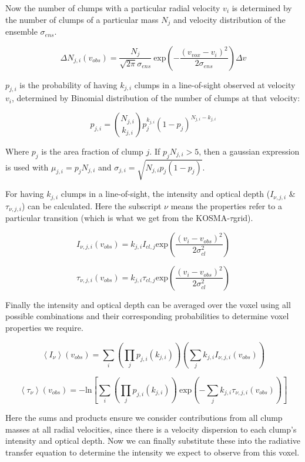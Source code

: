 \documentclass[a4paper]{article}
\newcommand{\kosmatau}{KOSMA-\(\tau\)}
\begin{document}
    Now the number of clumps with a particular radial velocity \(v_i\) is determined by the number of clumps of a particular mass \(N_j\) and velocity distribution of the ensemble \(\sigma_{ens}\).

    \[
    \Delta N_{j,i} (v_{obs}) = \frac{N_j}{\sqrt{2 \pi} \sigma_{ens}} \ \mathrm{exp} \left( -\frac{(v_{vox}-v_i)^2}{2 \sigma_{ens}} \right) \Delta v
    \]

    \(p_{j,i}\) is the probability of having \(k_{j,i}\) clumps in a line-of-sight observed at velocity \(v_i\), determined by Binomial distribution of the number of clumps at that velocity:

    \[
    p_{j,i} = \binom{N_{j,i}}{k_{j,i}} p_j^{k_{j,i}} (1-p_j)^{N_{j,i}-k_{j,i}}
    \]

    Where \(p_j\) is the area fraction of clump \(j\).
    If \(p_j N_{j,i}>5\), then a gaussian expression is used with \(\mu_{j,i} = p_j N_{j,i}\) and \(\sigma_{j,i} = \sqrt{N_{j,i} p_j (1-p_j)}\).

    For having \(k_{j,i}\) clumps in a line-of-sight, the intensity and optical depth (\(I_{\nu,j,i}\) \& \(\tau_{\nu,j,i}\)) can be calculated.
    Here the subscript \(\nu\) means the properties refer to a particular transition (which is what we get from the \kosmatau grid).

    \[
    I_{\nu,j,i} (v_{obs}) = k_{j,i} I_{cl,j} \mathrm{exp} \left( \frac{(v_i-v_{obs})^2}{2\sigma_{cl}^2} \right)
    \]

    \[
    \tau_{\nu,j,i} (v_{obs}) = k_{j,i} \tau_{cl,j} \mathrm{exp} \left( \frac{(v_i-v_{obs})^2}{2\sigma_{cl}^2} \right)
    \]

    Finally the intensity and optical depth can be averaged over the voxel using all possible combinations and their corresponding probabilities to determine voxel properties we require.

    \[
    \left< I_\nu \right> (v_{obs}) = \sum_i \left( \prod_j p_{j,i}(k_{j,i}) \right) \left( \sum_j k_{j,i} I_{\nu,j,i} (v_{obs}) \right)
    \]

    \[
    \left< \tau_\nu \right> (v_{obs}) = -\mathrm{ln} \left[ \sum_i \left( \prod_j p_{j,i}(k_{j,i}) \right) \ \mathrm{exp} \left( - \sum_j k_{j,i} \tau_{\nu,j,i} (v_{obs}) \right) \right]
    \]

    Here the sums and products ensure we consider contributions from all clump masses at all radial velocities, since there is a velocity dispersion to each clump's intensity and optical depth.
    Now we can finally substitute these into the radiative transfer equation to determine the intensity we expect to observe from this voxel.
\end{document}
